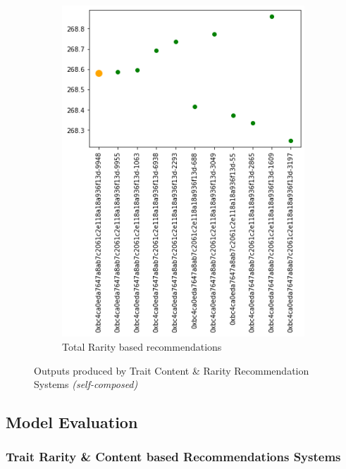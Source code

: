 \begin{figure}[h!]
\begin{subfigure}[b]{0.45\textwidth}
         \includegraphics[width=\textwidth]{images/Testing/Trait rarity representation graph - rarity recommendations.png}
         \caption{Total Rarity based recommendations}
         \label{fig:total-rarity-output}
     \end{subfigure}
     \hfill
        \caption{Outputs produced by Trait Content \& Rarity Recommendation Systems \textit{(self-composed)}}
        \label{fig:trait-recs-outputs}
\end{figure}



\subsection{Model Evaluation}

\subsubsection{Trait Rarity \& Content based Recommendations Systems}

